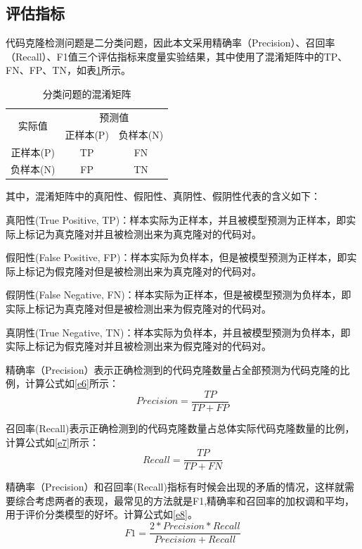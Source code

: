 \subsection{评估指标}
\label{subsec:Index}
代码克隆检测问题是二分类问题，因此本文采用精确率（Precision）、召回率（Recall）、F1值三个评估指标来度量实验结果，其中使用了混淆矩阵中的TP、FN、FP、TN，如表\ref{tab:ConfusionMatrix}所示。

\begin{table}[H]
  \centering
  \caption{分类问题的混淆矩阵} 
  \label{tab:ConfusionMatrix}
  \begin{tabular*}{0.7\textwidth}{@{\extracolsep{\fill}}ccc}
  \toprule
  \multirow{2}{*}{实际值} & \multicolumn{2}{c}{预测值} \\
  \cmidrule{2-3} 
  \multirow{2}{*}{} & 正样本(P) & 负样本(N) \\
  \midrule
    正样本(P)			&TP	  &FN		 \\
    负样本(N)			&FP		&TN		 \\
  \bottomrule
  \end{tabular*}
\end{table}

其中，混淆矩阵中的真阳性、假阳性、真阴性、假阴性代表的含义如下：

真阳性(True Positive, TP)：样本实际为正样本，并且被模型预测为正样本，即实际上标记为真克隆对并且被检测出来为真克隆对的代码对。
 
假阳性(False Positive, FP)：样本实际为负样本，但是被模型预测为正样本，即实际上标记为假克隆对但是被检测出来为真克隆对的代码对。
 
假阴性(False Negative, FN)：样本实际为正样本，但是被模型预测为负样本，即实际上标记为真克隆对但是被检测出来为假克隆对的代码对。
 
真阴性(True Negative, TN)：样本实际为负样本，并且被模型预测为负样本，即实际上标记为假克隆对并且被检测出来为假克隆对的代码对。

精确率（Precision）表示正确检测到的代码克隆数量占全部预测为代码克隆的比例，计算公式如\ref{e6}所示：
\begin{equation}\label{e6}
  Precision = \frac{TP}{TP+FP} 
\end{equation}

召回率(Recall)表示正确检测到的代码克隆数量占总体实际代码克隆数量的比例，计算公式如\ref{e7}所示：
\begin{equation}\label{e7}
  Recall = \frac{TP}{TP+FN} 
\end{equation}

精确率（Precision）和召回率(Recall)指标有时候会出现的矛盾的情况，这样就需要综合考虑两者的表现，最常见的方法就是F1,精确率和召回率的加权调和平均，用于评价分类模型的好坏。计算公式如\ref{e8}。
\begin{equation}\label{e8}
  F1 = \frac{2*Precision*Recall}{Precision+Recall} 
\end{equation}

